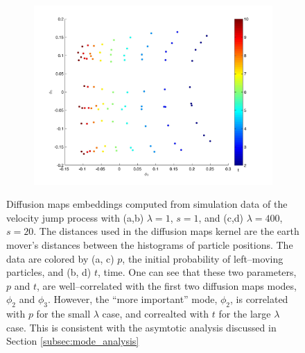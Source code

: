 \documentclass[12pt]{article}
\begin{document}
\begin{figure}[htb]
\begin{subfigure}{0.5\textwidth}
\caption{}
\end{subfigure}
\begin{subfigure}{0.5\textwidth}
\includegraphics[width=\textwidth]{EMD_t_400}
\caption{}
\end{subfigure}
\caption{Diffusion maps embeddings computed from simulation data of the velocity jump process with (a,b) $\lambda=1$, $s=1$, and (c,d) $\lambda=400$, $s=20$. The distances used in the diffusion maps kernel are the earth mover's distances between the histograms of particle positions. The data are colored by (a, c) $p$, the initial probability of left--moving particles, and (b, d) $t$, time. One can see that these two parameters, $p$ and $t$, are well--correlated with the first two diffusion maps modes, $\phi_2$ and $\phi_3$. However, the ``more important'' mode, $\phi_2$, is correlated with $p$ for the small $\lambda$ case, and correalted with $t$ for the large $\lambda$ case. This is consistent with the asymtotic analysis discussed in Section \ref{subsec:mode_analysis}}
\label{fig:dmaps_embed}
\end{figure}
\end{document}
